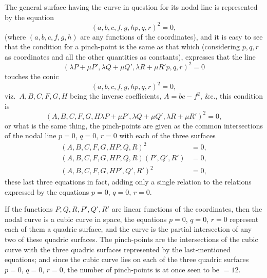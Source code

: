 \documentclass[11pt,a4paper]{article}
\theoremstyle{definition}
\begin{document}
The general surface having the curve in question for its nodal line is represented by the equation
\[
(a,b,c,f,g,h p,q,r)^2 = 0,
\]
(where $(a,b,c,f,g,h)$ are any functions of the coordinates), and it is easy to see that the condition for a pinch-point is the same as that which (considering $p, q, r$ as coordinates and all the other quantities as constants), expresses that the line
\[
(\lambda P + \mu P', \lambda Q + \mu Q', \lambda R + \mu R' p,q,r)^2 = 0
\]
touches the conic
\[
(a,b,c,f,g,h p,q,r)^2 = 0,
\]
viz.\ $A, B, C, F, G, H$ being the inverse coefficients, $A = bc - f^2$, \&c., this condition is
\[
(A,B,C,F,G,H \lambda P + \mu P', \lambda Q + \mu Q', \lambda R + \mu R')^2 = 0,
\]
or what is the same thing, the pinch-points are given as the common intersections of the nodal line $p = 0$, $q = 0$, $r = 0$ with each of the three surfaces
\begin{align*}
(A,B,C,F,G,H P,Q,R)^2 &= 0,\\
(A,B,C,F,G,H P,Q,R)(P',Q',R') &= 0,\\
(A,B,C,F,G,H P',Q',R')^2 &= 0,
\end{align*}
these last three equations in fact, adding only a single relation to the relations expressed by the equations $p = 0$, $q = 0$, $r = 0$.

If the functions $P, Q, R, P', Q', R'$ are linear functions of the coordinates, then the nodal curve is a cubic curve in space, the equations $p = 0$, $q = 0$, $r = 0$ represent each of them a quadric surface, and the curve is the partial intersection of any two of these quadric surfaces. The pinch-points are the intersections of the cubic curve with the three quadric surfaces represented by the last-mentioned equations; and since the cubic curve lies on each of the three quadric surfaces $p = 0$, $q = 0$, $r = 0$, the number of pinch-points is at once seen to be $= 12$.

\newpage
\end{document}
